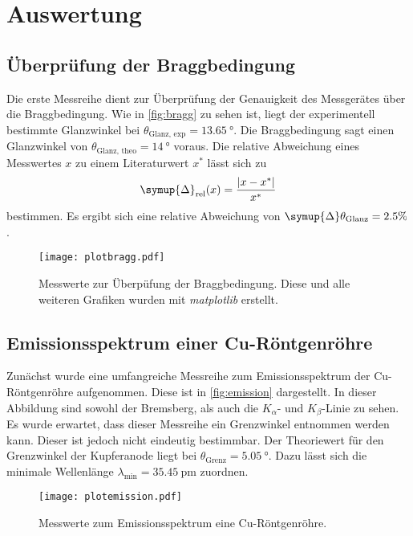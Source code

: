 \section{Auswertung}
\label{sec:Auswertung}
\subsection{Überprüfung der Braggbedingung}
\label{subsec:bragg}
Die erste Messreihe dient zur Überprüfung der Genauigkeit des Messgerätes über die Braggbedingung. Wie in 
\autoref{fig:bragg} zu sehen ist, liegt der experimentell bestimmte Glanzwinkel bei $\theta_\text{Glanz, exp} = \qty{13.65}{\degree}$. Die Braggbedingung sagt einen 
Glanzwinkel von $\theta_\text{Glanz, theo} = \qty{14}{\degree}$ voraus.
Die relative Abweichung eines Messwertes $x$ zu einem Literaturwert $x^*$ lässt sich zu 
\begin{equation}
  \label{eqn:Delta_rel}
  \symup{\Delta}_\text{rel}(x) = \frac{|x - x^*|}{x^*}
\end{equation}
bestimmen.
Es ergibt sich eine relative Abweichung von $\symup{\Delta} \theta_\text{Glanz} = 2.5\%$.
\begin{figure}
    \centering
    \texttt{[image: plotbragg.pdf]}
    \caption{Messwerte zur Überpüfung der Braggbedingung. Diese und alle weiteren Grafiken wurden mit \textit{matplotlib} \cite{matplotlib} erstellt.}
    \label{fig:bragg}
\end{figure}

\subsection{Emissionsspektrum einer Cu-Röntgenröhre}
\label{subsec:emission}
Zunächst wurde eine umfangreiche Messreihe zum Emissionsspektrum der Cu-Röntgenröhre aufgenommen. Diese ist in \autoref{fig:emission} dargestellt. In dieser Abbildung sind
sowohl der Bremsberg, als auch die $K_{\alpha}$- und $K_{\beta}$-Linie zu sehen. Es wurde erwartet, dass dieser Messreihe ein Grenzwinkel entnommen werden kann. 
Dieser ist jedoch nicht eindeutig bestimmbar. Der Theoriewert für den Grenzwinkel der Kupferanode liegt bei $\theta_{\text{Grenz}} = \qty{5.05}{\degree}$.
Dazu lässt sich die minimale Wellenlänge $\lambda_{\text{min}} = \qty{35.45}{\pico\metre}$ zuordnen. 

\begin{figure}
    \centering
    \texttt{[image: plotemission.pdf]}
    \caption{Messwerte zum Emissionsspektrum eine Cu-Röntgenröhre.}
    \label{fig:emission}
  \end{figure}

